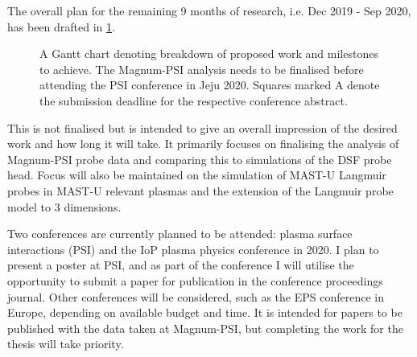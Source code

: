 \documentclass[a4paper, 12pt]{article} %
\begin{document}
	The overall plan for the remaining 9 months of research, i.e. Dec 2019 - Sep 2020, has been drafted in \cref{fig:timeline}.
	\begin{figure}[t]
		\vspace{-0pt}
		\caption{A Gantt chart denoting breakdown of proposed work and milestones to achieve. The Magnum-PSI analysis needs to be finalised before attending the PSI conference in Jeju 2020. Squares marked A denote the submission deadline for the respective conference abstract.}
		\label{fig:timeline} 
	\end{figure}
	This is not finalised but is intended to give an overall impression of the desired work and how long it will take. 
	It primarily focuses on finalising the analysis of Magnum-PSI probe data and comparing this to simulations of the DSF probe head. 
	Focus will also be maintained on the simulation of MAST-U Langmuir probes in MAST-U relevant plasmas and the extension of the Langmuir probe model to 3 dimensions. 
	
	Two conferences are currently planned to be attended: plasma surface interactions (PSI) and the IoP plasma physics conference in 2020.
	I plan to present a poster at PSI, and as part of the conference I will utilise the opportunity to submit a paper for publication in the conference proceedings journal.
	Other conferences will be considered, such as the EPS conference in Europe, depending on available budget and time.
	It is intended for papers to be published with the data taken at Magnum-PSI, but completing the work for the thesis will take priority. 




\begingroup
{}
\setlength\bibitemsep{3.5pt}
\printbibliography
\endgroup
%
%

\end{document}
